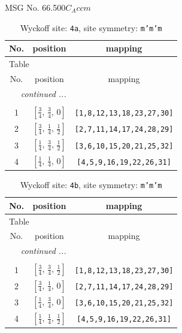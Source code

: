\documentclass[fleqn,8pt]{jsarticle}
\begin{document}
\setcounter{MaxMatrixCols}{32}

\renewcommand{\tablename}{Table~}
\renewcommand{\figurename}{Figure~}
\begin{center}
\LARGE
MSG No. 66.500\quad$C_{A}ccm$
\end{center}
\renewcommand{\arraystretch}{1.2}
\begin{longtable}{ccc}
\caption{Wyckoff site: {\tt 4a}, site symmetry: {\tt m'm'm}}
 \\
 \hline \hline
No. & position & mapping \\ \hline \endfirsthead

\multicolumn{2}{l}{\tablename\ \thetable{}} \\
 \hline \hline
No. & position & mapping \\ \hline \endhead

 \hline \hline
\multicolumn{2}{r}{\footnotesize\it continued ...} \\ \endfoot

 \hline \hline
\multicolumn{2}{r}{} \\ \endlastfoot

1 & $\left[ \frac{3}{4},\, \frac{3}{4},\, 0 \right]$ & {\tt [1,8,12,13,18,23,27,30]} \\ \hline
2 & $\left[ \frac{3}{4},\, \frac{1}{4},\, \frac{1}{2} \right]$ & {\tt [2,7,11,14,17,24,28,29]} \\ \hline
3 & $\left[ \frac{1}{4},\, \frac{3}{4},\, \frac{1}{2} \right]$ & {\tt [3,6,10,15,20,21,25,32]} \\ \hline
4 & $\left[ \frac{1}{4},\, \frac{1}{4},\, 0 \right]$ & {\tt [4,5,9,16,19,22,26,31]} \\
\end{longtable}
\renewcommand{\arraystretch}{1.2}
\begin{longtable}{ccc}
\caption{Wyckoff site: {\tt 4b}, site symmetry: {\tt m'm'm}}
 \\
 \hline \hline
No. & position & mapping \\ \hline \endfirsthead

\multicolumn{2}{l}{\tablename\ \thetable{}} \\
 \hline \hline
No. & position & mapping \\ \hline \endhead

 \hline \hline
\multicolumn{2}{r}{\footnotesize\it continued ...} \\ \endfoot

 \hline \hline
\multicolumn{2}{r}{} \\ \endlastfoot

1 & $\left[ \frac{3}{4},\, \frac{3}{4},\, \frac{1}{2} \right]$ & {\tt [1,8,12,13,18,23,27,30]} \\ \hline
2 & $\left[ \frac{3}{4},\, \frac{1}{4},\, 0 \right]$ & {\tt [2,7,11,14,17,24,28,29]} \\ \hline
3 & $\left[ \frac{1}{4},\, \frac{3}{4},\, 0 \right]$ & {\tt [3,6,10,15,20,21,25,32]} \\ \hline
4 & $\left[ \frac{1}{4},\, \frac{1}{4},\, \frac{1}{2} \right]$ & {\tt [4,5,9,16,19,22,26,31]} \\
\end{longtable}
\end{document}
